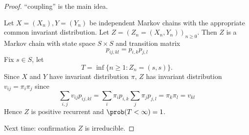 \documentclass[a4paper]{article}
\begin{document}
\begin{proof}
  ``coupling'' is the main idea.

  Let \(X = (X_n), Y = (Y_n)\) be independent Markov chains with the appropriate common invariant distribution. Let \(Z = (Z_n = (X_n, Y_n))_{n \geq 0}\). Then \(Z\) is a Markov chain with state space \(S \times S\) and transition matrix
  \[
    p_{ij, kl} = p_{i, k}p_{j, l}
  \]
  Fix \(s \in S\), let
  \[
    T = \inf \{n \geq 1: Z_n = (s, s)\}.
  \]
  Since \(X\) and \(Y\) have invariant distribution \(\pi\), \(Z\) has invariant distribution \(v_{ij} = \pi_i\pi_j\) since
  \[
    \sum_{i,j } v_{ij}p_{ij, kl} = \sum_i \pi_i p_{i, k} \sum_j \pi_j p_{j, l} = \pi_k \pi_l = v_{kl}
  \]
  Hence \(Z\) is positive recurrent and \(\prob(T < \infty) = 1\).

  Next time: confirmation \(Z\) is irreducible.
\end{proof}
\iffalse
\appendix

\section{Resources}


Reading list: Probability, an introduction Grimmet, Welsh, 2nd edition, Chapter 12

\fi
\end{document}

